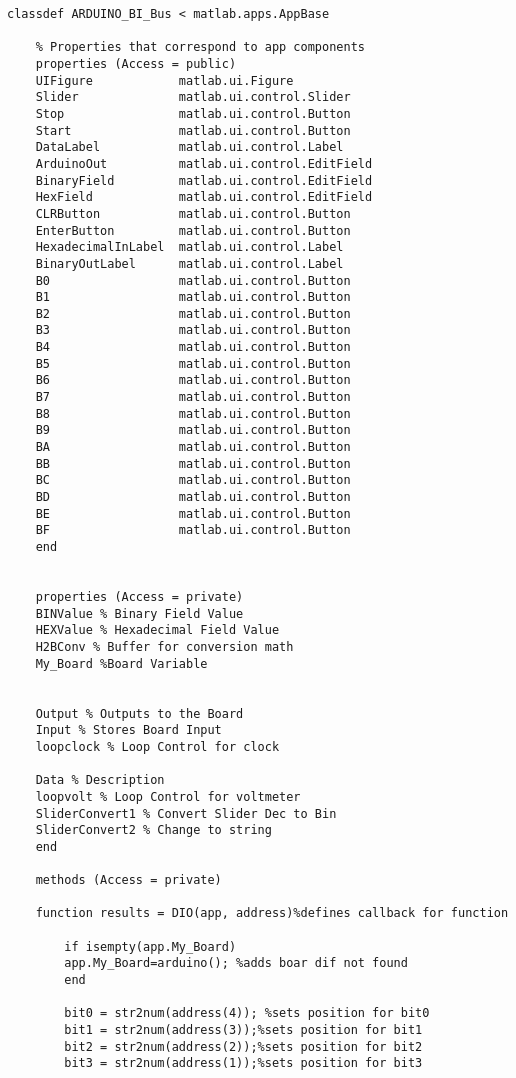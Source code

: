 \documentclass[11pt]{article}
\begin{document}
\begin{verbatim}
classdef ARDUINO_BI_Bus < matlab.apps.AppBase

    % Properties that correspond to app components
    properties (Access = public)
	UIFigure            matlab.ui.Figure
	Slider              matlab.ui.control.Slider
	Stop                matlab.ui.control.Button
	Start               matlab.ui.control.Button
	DataLabel           matlab.ui.control.Label
	ArduinoOut          matlab.ui.control.EditField
	BinaryField         matlab.ui.control.EditField
	HexField            matlab.ui.control.EditField
	CLRButton           matlab.ui.control.Button
	EnterButton         matlab.ui.control.Button
	HexadecimalInLabel  matlab.ui.control.Label
	BinaryOutLabel      matlab.ui.control.Label
	B0                  matlab.ui.control.Button
	B1                  matlab.ui.control.Button
	B2                  matlab.ui.control.Button
	B3                  matlab.ui.control.Button
	B4                  matlab.ui.control.Button
	B5                  matlab.ui.control.Button
	B6                  matlab.ui.control.Button
	B7                  matlab.ui.control.Button
	B8                  matlab.ui.control.Button
	B9                  matlab.ui.control.Button
	BA                  matlab.ui.control.Button
	BB                  matlab.ui.control.Button
	BC                  matlab.ui.control.Button
	BD                  matlab.ui.control.Button
	BE                  matlab.ui.control.Button
	BF                  matlab.ui.control.Button
    end


    properties (Access = private)
	BINValue % Binary Field Value
	HEXValue % Hexadecimal Field Value
	H2BConv % Buffer for conversion math
	My_Board %Board Variable


	Output % Outputs to the Board
	Input % Stores Board Input
	loopclock % Loop Control for clock

	Data % Description
	loopvolt % Loop Control for voltmeter
	SliderConvert1 % Convert Slider Dec to Bin
	SliderConvert2 % Change to string
    end

    methods (Access = private)

	function results = DIO(app, address)%defines callback for function

	    if isempty(app.My_Board)
		app.My_Board=arduino(); %adds boar dif not found
	    end 

	    bit0 = str2num(address(4)); %sets position for bit0
	    bit1 = str2num(address(3));%sets position for bit1
	    bit2 = str2num(address(2));%sets position for bit2
	    bit3 = str2num(address(1));%sets position for bit3


\end{verbatim}
\end{document}
